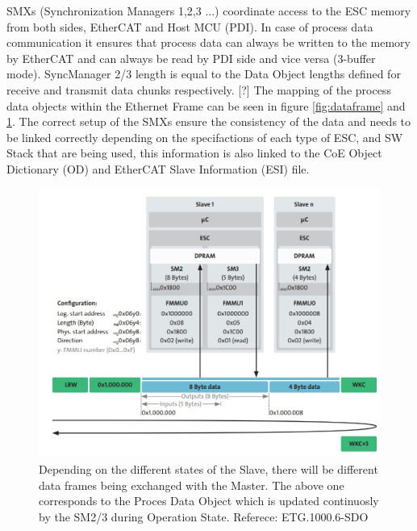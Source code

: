 SMXs (Synchronization Managers 1,2,3 ...) coordinate access to the ESC memory from both sides, EtherCAT and
Host MCU (PDI). In case of process data communication it ensures that process data can
always be written to the memory by EtherCAT and can always be read by PDI side and vice versa (3-buffer mode). SyncManager 2/3 length is equal
to the Data Object lengths defined for receive and transmit data chunks respectively. [?] %
The mapping of the process data objects within the Ethernet Frame can be seen in figure \ref{fig:dataframe} and \ref{fig:pdomapping}.
The correct setup of the SMXs ensure the consistency of the data and needs to be linked correctly depending on the specifactions of each type of ESC,
 and SW Stack that are being used, this information is also linked to the CoE Object Dictionary (OD) and EtherCAT Slave Information (ESI) file.
\begin{figure}[ht]
    \centering
    \includegraphics[width=.85\textwidth]{imgs/impl-dataframe_pdo.jpg}
    \caption{Depending on the different states of the Slave, there will be different data frames being exchanged with the Master. 
    The above one corresponds to the Proces Data Object which is updated continuosly by the SM2/3 during Operation State. Referece: 
    ETG.1000.6-SDO}
    \label{fig:pdomapping}
\end{figure}


